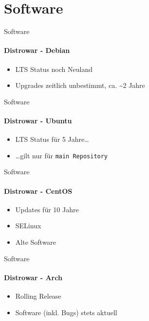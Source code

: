 \section{Software}

\begin{frame}{Software}
\framesubtitle{Distrowar - Debian}
\begin{itemize}
\item LTS Status noch Neuland
\pause
\item Upgrades zeitlich unbestimmt, ca. \textasciitilde{}2 Jahre
\end{itemize}
\end{frame}

\begin{frame}{Software}
\framesubtitle{Distrowar - Ubuntu}
\begin{itemize}
\item LTS Status für 5 Jahre…
\pause
\item …gilt nur für \tt{main} Repository
\end{itemize}
\end{frame}

\begin{frame}{Software}
\framesubtitle{Distrowar - CentOS}
\begin{itemize}
\item Updates für 10 Jahre
\pause
\item SELinux
\pause
\item Alte Software
\end{itemize}
\end{frame}

\begin{frame}{Software}
\framesubtitle{Distrowar - Arch}
\begin{itemize}
\item Rolling Release
\pause
\item Software (inkl. Bugs) stets aktuell
\end{itemize}
\end{frame}
